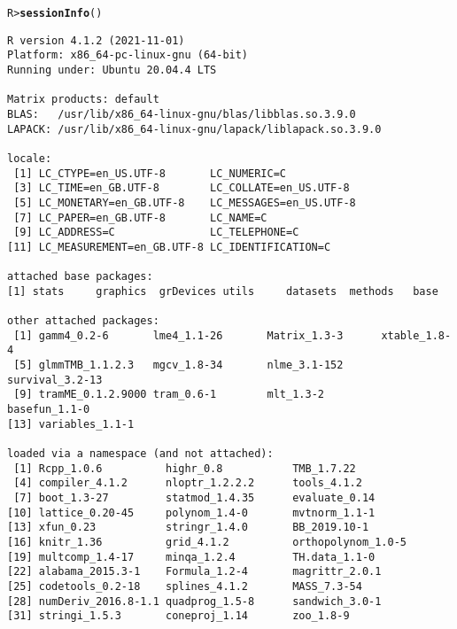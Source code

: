 \documentclass[11pt]{article}\usepackage[]{graphicx}\usepackage{xcolor}
\makeatletter
\newcommand{\hlstd}[1]{\textcolor[rgb]{0.345,0.345,0.345}{#1}}%
\newcommand{\hlkwd}[1]{\textcolor[rgb]{0.737,0.353,0.396}{\textbf{#1}}}%
\newenvironment{kframe}{%
 \def\at@end@of@kframe{}%
 \ifinner\ifhmode%
  \def\at@end@of@kframe{\end{minipage}}%
  \begin{minipage}{\columnwidth}%
 \fi\fi%
 \def\FrameCommand##1{\hskip\@totalleftmargin \hskip-\fboxsep
 \colorbox{shadecolor}{##1}\hskip-\fboxsep
     \hskip-\linewidth \hskip-\@totalleftmargin \hskip\columnwidth}%
 \MakeFramed {\advance\hsize-\width
   \@totalleftmargin\z@ \linewidth\hsize
   \@setminipage}}%
 {\par\unskip\endMakeFramed%
 \at@end@of@kframe}
\newenvironment{knitrout}{}{} %
\newcommand{\0}{{\mathbf{0}}}
\makeatother
\begin{document}
\begin{knitrout}\small
{}\color{fgcolor}\begin{kframe}
\begin{alltt}
\hlstd{R> }\hlkwd{sessionInfo}\hlstd{()}
\end{alltt}
\begin{verbatim}
R version 4.1.2 (2021-11-01)
Platform: x86_64-pc-linux-gnu (64-bit)
Running under: Ubuntu 20.04.4 LTS

Matrix products: default
BLAS:   /usr/lib/x86_64-linux-gnu/blas/libblas.so.3.9.0
LAPACK: /usr/lib/x86_64-linux-gnu/lapack/liblapack.so.3.9.0

locale:
 [1] LC_CTYPE=en_US.UTF-8       LC_NUMERIC=C              
 [3] LC_TIME=en_GB.UTF-8        LC_COLLATE=en_US.UTF-8    
 [5] LC_MONETARY=en_GB.UTF-8    LC_MESSAGES=en_US.UTF-8   
 [7] LC_PAPER=en_GB.UTF-8       LC_NAME=C                 
 [9] LC_ADDRESS=C               LC_TELEPHONE=C            
[11] LC_MEASUREMENT=en_GB.UTF-8 LC_IDENTIFICATION=C       

attached base packages:
[1] stats     graphics  grDevices utils     datasets  methods   base     

other attached packages:
 [1] gamm4_0.2-6       lme4_1.1-26       Matrix_1.3-3      xtable_1.8-4     
 [5] glmmTMB_1.1.2.3   mgcv_1.8-34       nlme_3.1-152      survival_3.2-13  
 [9] tramME_0.1.2.9000 tram_0.6-1        mlt_1.3-2         basefun_1.1-0    
[13] variables_1.1-1  

loaded via a namespace (and not attached):
 [1] Rcpp_1.0.6          highr_0.8           TMB_1.7.22         
 [4] compiler_4.1.2      nloptr_1.2.2.2      tools_4.1.2        
 [7] boot_1.3-27         statmod_1.4.35      evaluate_0.14      
[10] lattice_0.20-45     polynom_1.4-0       mvtnorm_1.1-1      
[13] xfun_0.23           stringr_1.4.0       BB_2019.10-1       
[16] knitr_1.36          grid_4.1.2          orthopolynom_1.0-5 
[19] multcomp_1.4-17     minqa_1.2.4         TH.data_1.1-0      
[22] alabama_2015.3-1    Formula_1.2-4       magrittr_2.0.1     
[25] codetools_0.2-18    splines_4.1.2       MASS_7.3-54        
[28] numDeriv_2016.8-1.1 quadprog_1.5-8      sandwich_3.0-1     
[31] stringi_1.5.3       coneproj_1.14       zoo_1.8-9          
\end{verbatim}
\end{kframe}
\end{knitrout}
\end{document}
